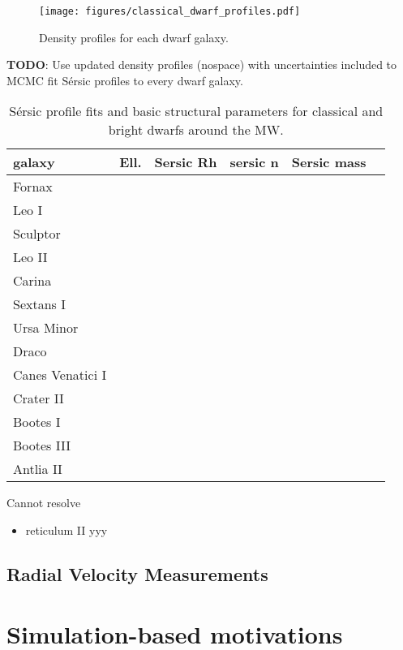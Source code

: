 \begin{figure}
\centering
\texttt{[image: figures/classical\_dwarf\_profiles.pdf]}
\caption[Sculptor and UMi versus classical dwarfs]{Density profiles for
each dwarf galaxy.}
\end{figure}

\textbf{TODO}: Use updated density profiles (nospace) with uncertainties
included to MCMC fit Sérsic profiles to every dwarf galaxy.

\begin{table*}[t]
\centering
\caption{Sérsic profile fits and basic structural parameters for classical and bright dwarfs around the MW.}
\label{tbl:Sérsic-profile-fits-and-basic-structural-parameters-for-classical-and-bright-dwarfs-around-the-MW}
\begin{tabular}{llllll}
\toprule
galaxy & Ell. & Sersic Rh & sersic n & Sersic mass & \\
\midrule
Fornax &  &  &  &  & \\
Leo I &  &  &  &  & \\
Sculptor &  &  &  &  & \\
Leo II &  &  &  &  & \\
Carina &  &  &  &  & \\
Sextans I &  &  &  &  & \\
Ursa Minor &  &  &  &  & \\
Draco &  &  &  &  & \\
Canes Venatici I &  &  &  &  & \\
Crater II &  &  &  &  & \\
Bootes I &  &  &  &  & \\
Bootes III &  &  &  &  & \\
Antlia II &  &  &  &  & \\
\bottomrule
\end{tabular}
\end{table*}

Cannot resolve

\begin{itemize}
\tightlist
\item
  reticulum II yyy
\end{itemize}

\subsection{Radial Velocity
Measurements}\label{radial-velocity-measurements}

\section{Simulation-based
motivations}\label{simulation-based-motivations}

